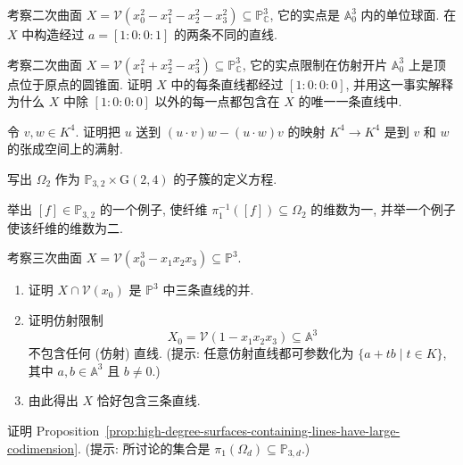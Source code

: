 \BookExerciseHeading
\begin{BookExercises}
  \item\label{ex:two-lines-through-point-on-complex-quadric} 考察二次曲面 $X=\mathcal{V}(x_{0}^{2}-x_{1}^{2}-x_{2}^{2}-x_{3}^{2})\subseteq\mathbb{P}_{\mathbb{C}}^{3}$, 它的实点是 $\mathbb{A}_{0}^{3}$ 内的单位球面. 在 $X$ 中构造经过 $a=[1:0:0:1]$ 的两条不同的直线.
  \item\label{ex:lines-on-quadric-cone-pass-through-vertex} 考察二次曲面 $X=\mathcal{V}(x_{1}^{2}+x_{2}^{2}-x_{3}^{2})\subseteq\mathbb{P}_{\mathbb{C}}^{3}$, 它的实点限制在仿射开片 $\mathbb{A}_{0}^{3}$ 上是顶点位于原点的圆锥面. 证明 $X$ 中的每条直线都经过 $[1:0:0:0]$, 并用这一事实解释为什么 $X$ 中除 $[1:0:0:0]$ 以外的每一点都包含在 $X$ 的唯一一条直线中.
  \item\label{ex:dot-product-map-onto-span} 令 $v,w\in K^{4}$. 证明把 $u$ 送到 $(u\cdot v)w-(u\cdot w)v$ 的映射 $K^{4}\to K^{4}$ 是到 $v$ 和 $w$ 的张成空间上的满射.
  \item\label{ex:equations-defining-incidence-variety-in-degree-two} 写出 $\Omega_{2}$ 作为 $\mathbb{P}_{3,2}\times\mathrm{G}(2,4)$ 的子簇的定义方程.
  \item\label{ex:fibers-of-different-dimensions-for-quadric-lines} 举出 $[f]\in\mathbb{P}_{3,2}$ 的一个例子, 使纤维 $\pi_{1}^{-1}([f])\subseteq\Omega_{2}$ 的维数为一, 并举一个例子使该纤维的维数为二.
  \item\label{ex:cubic-surface-containing-exactly-three-lines} 考察三次曲面 $X=\mathcal{V}(x_{0}^{3}-x_{1}x_{2}x_{3})\subseteq\mathbb{P}^{3}$.
  \begin{enumerate}
    \item 证明 $X\cap\mathcal{V}(x_{0})$ 是 $\mathbb{P}^{3}$ 中三条直线的并.
    \item 证明仿射限制
    \[
      X_{0}=\mathcal{V}(1-x_{1}x_{2}x_{3})\subseteq\mathbb{A}^{3}
    \]
    不包含任何 (仿射) 直线. (提示: 任意仿射直线都可参数化为 $\{a+tb\mid t\in K\}$, 其中 $a,b\in\mathbb{A}^{3}$ 且 $b\ne0$.)
    \item 由此得出 $X$ 恰好包含三条直线.
  \end{enumerate}
  \item\label{ex:codimension-of-high-degree-surfaces-containing-lines} 证明 Proposition~\ref{prop:high-degree-surfaces-containing-lines-have-large-codimension}. (提示: 所讨论的集合是 $\pi_{1}(\Omega_{d})\subseteq\mathbb{P}_{3,d}$.)
\end{BookExercises}
